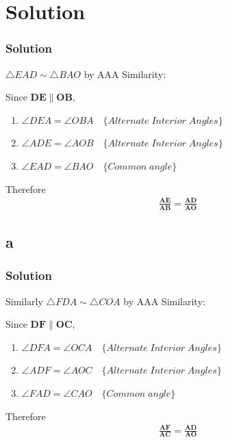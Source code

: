 \documentclass{beamer}
\renewcommand{\vec}[1]{\mathbf{#1}}
\begin{document}
\begin{frame}[fragile]
\begin{columns}
\begin{column}{0.5\textwidth}
  
 \end{column}
\end{columns}
\end{frame}








\section*{\textbf{Solution}}
\begin{frame}[fragile]
\footnotesize
\frametitle{Solution}
 $\triangle EAD \sim \triangle BAO$ by AAA Similarity:

Since $\vec{DE} \parallel \vec{OB}$,
\begin{enumerate}
	\item $\angle{DEA} = \angle{OBA} \quad \{Alternate\; Interior\; Angles\}$
	\item $\angle{ADE} = \angle{AOB} \quad \{Alternate\; Interior\; Angles\}$
	  
	\item $\angle{EAD} = \angle{BAO} \quad \{Common\; angle\} $
	
\end{enumerate}

Therefore 
\begin{align}
\vec{\frac{AE}{AB}} = \vec{\frac{AD}{AO}}
\end{align}
\end{frame}
\subsection{a}


\begin{frame}
\frametitle{Solution}
\footnotesize
\label{a}
Similarly 
$\triangle FDA \sim \triangle COA$ by AAA Similarity:

Since $\vec{DF} \parallel \vec{OC}$,
\begin{enumerate}
	\item $\angle{DFA} = \angle{OCA} \quad \{Alternate\; Interior\; Angles\}$
	\item $\angle{ADF} = \angle{AOC} \quad \{Alternate\; Interior\; Angles\}$
	  
	\item $\angle{FAD} = \angle{CAO} \quad \{Common\; angle\} $
	
\end{enumerate}

Therefore 
\begin{align}
\vec{\frac{AF}{AC}} = \vec{\frac{AD}{AO}}
\end{align}
\end{frame}
\end{document}
